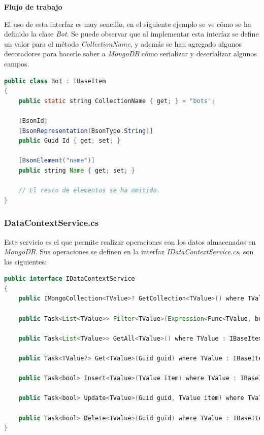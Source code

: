 \medskip

\textbf{Flujo de trabajo}

El uso de esta interfaz es muy sencillo, en el siguiente ejemplo se ve cómo se ha definido la clase \textit{Bot}. Se puede observar que al implementar esta interfaz se define un valor para el método \textit{CollectionName}, y además se han agregado algunos decoradores para hacerle saber a \textit{MongoDB} cómo serializar y deserializar algunos campos.


\pagebreak

\begin{lstlisting}[language=java]
public class Bot : IBaseItem
{
    public static string CollectionName { get; } = "bots";

    [BsonId]
    [BsonRepresentation(BsonType.String)]
    public Guid Id { get; set; }
    
    [BsonElement("name")]
    public string Name { get; set; }
    
    // El resto de elementos se ha omitido.
}
\end{lstlisting}

\subsubsection{DataContextService.cs}
\label{sec:datacontextservice}


Este servicio es el que permite realizar operaciones con los datos almacenados en \textit{MongoDB}. Sus operaciones se definen en la interfaz \textit{IDataContextService.cs}, son las siguientes:

\begin{lstlisting}[language=java]
public interface IDataContextService
{
    public IMongoCollection<TValue>? GetCollection<TValue>() where TValue : IBaseItem;

    public Task<List<TValue>> Filter<TValue>(Expression<Func<TValue, bool>> filter) where TValue : IBaseItem;

    public Task<List<TValue>> GetAll<TValue>() where TValue : IBaseItem;

    public Task<TValue?> Get<TValue>(Guid guid) where TValue : IBaseItem;

    public Task<bool> Insert<TValue>(TValue item) where TValue : IBaseItem;

    public Task<bool> Update<TValue>(Guid guid, TValue item) where TValue : IBaseItem;

    public Task<bool> Delete<TValue>(Guid guid) where TValue : IBaseItem;
}
\end{lstlisting}

